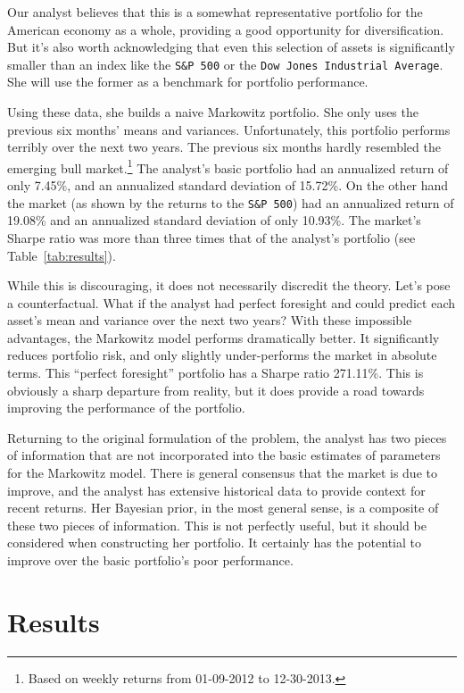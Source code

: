 \documentclass[a4paper]{article}\usepackage[]{graphicx}\usepackage[]{color}
\begin{document}
Our analyst believes that this is a somewhat representative portfolio for the American economy as a whole, providing a good opportunity for diversification. But it's also worth acknowledging that even this selection of assets is significantly smaller than an index like the \texttt{S\&P 500} or the \texttt{Dow Jones Industrial Average}. She will use the former as a benchmark for portfolio performance.

Using these data, she builds a naive Markowitz portfolio. She only uses the previous six months' means and variances. Unfortunately, this portfolio performs terribly over the next two years. The previous six months hardly resembled the emerging bull market.\footnote{Based on weekly returns from 01-09-2012 to 12-30-2013.} The analyst's basic portfolio had an annualized return of only 7.45\%, and an annualized standard deviation of 15.72\%. On the other hand the market (as shown by the returns to the \texttt{S\&P 500}) had an annualized return of 19.08\% and an annualized standard deviation of only 10.93\%. The market's Sharpe ratio was more than three times that of the analyst's portfolio (see Table~\ref{tab:results}).

While this is discouraging, it does not necessarily discredit the theory. Let's pose a counterfactual. What if the analyst had perfect foresight and could predict each asset's mean and variance over the next two years? With these impossible advantages, the Markowitz model performs dramatically better. It significantly reduces portfolio risk, and only slightly under-performs the market in absolute terms. This ``perfect foresight'' portfolio has a Sharpe ratio 271.11\%. This is obviously a sharp departure from reality, but it does provide a road towards improving the performance of the portfolio. 

Returning to the original formulation of the problem, the analyst has two pieces of information that are not incorporated into the basic estimates of parameters for the Markowitz model. There is general consensus that the market is due to improve, and the analyst has extensive historical data to provide context for recent returns. Her Bayesian prior, in the most general sense, is a composite of these two pieces of information. This is not perfectly useful, but it should be considered when constructing her portfolio. It certainly has the potential to improve over the basic portfolio's poor performance.

\section{Results}
\end{document}

